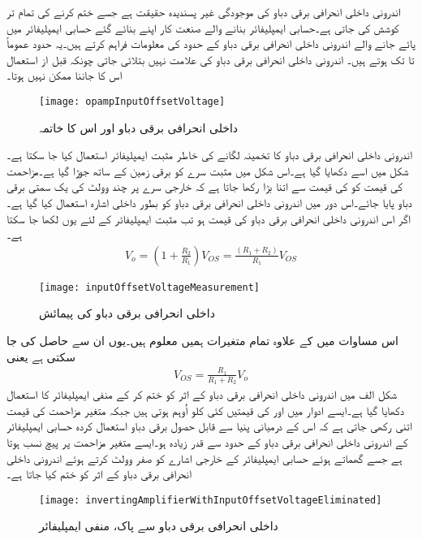 	اندرونی داخلی انحرافی برقی دباو کی موجودگی غیر پسندیدہ حقیقت ہے جسے ختم کرنے کی تمام تر کوشش کی جاتی ہے۔حسابی ایمپلیفائر بنانے والے صنعت کار اپنے بنائے گئے حسابی ایمپلیفائر میں پائے جانے والے اندرونی داخلی انحرافی برقی دباو کے حدود کی معلومات فراہم کرتے ہیں۔یہ حدود عموماً   تا  تک ہوتے ہیں۔ اندرونی داخلی انحرافی برقی دباو کی علامت نہیں بتلائی جاتی چونکہ قبل از استعمال اس کا جاننا ممکن نہیں ہوتا۔
\begin{figure}
\centering
\texttt{[image: opampInputOffsetVoltage]}
\caption{داخلی انحرافی برقی دباو اور اس کا خاتمہ}
\label{شکل_انحرافی_برقی_دباو_اور_اس_کا_خاتمہ}
\end{figure}
اندرونی داخلی انحرافی برقی دباو کا تخمینہ لگانے کی خاطر مثبت ایمپلیفائر استعمال کیا جا سکتا ہے۔شکل  میں اسے دکھایا گیا ہے۔اس شکل میں مثبت سرے کو برقی زمین کے ساتھ جوڑا گیا ہے۔مزاحمت  کی قیمت کو  کی قیمت سے اتنا بڑا رکھا جاتا ہے کہ خارجی  سرے پر چند وولٹ کی یک سمتی برقی دباو  پایا جائے۔اس دور میں اندرونی داخلی انحرافی برقی دباو کو بطور داخلی اشارہ استعمال کیا گیا ہے۔اگر اس اندرونی داخلی انحرافی برقی دباو کی قیمت  ہو تب مثبت ایمپلیفائر کے لئے یوں لکھا جا سکتا ہے۔
\begin{align}
V_{o}=\left (1+\frac{R_2}{R_1} \right ) V_{OS} =\frac{\left (R_1+R_2 \right )}{R_1} V_{OS}
\end{align}
%
\begin{figure}
\centering
\texttt{[image: inputOffsetVoltageMeasurement]}
\caption{داخلی انحرافی برقی دباو کی پیمائش}
\label{شکل_داخلی_انحرافی_برقی_دباو_کی_پیمائش}
\end{figure}
اس مساوات میں  کے علاوہ تمام متغیرات ہمیں معلوم ہیں۔یوں ان سے حاصل کی جا سکتی ہے یعنی
\begin{align}
V_{OS}=\frac{R_1}{R_1+R_2} V_{o}
\end{align}
شکل  الف میں اندرونی داخلی انحرافی برقی دباو کے اثر کو ختم کر کے منفی ایمپلیفائر کا استعمال دکھایا گیا ہے۔ایسے ادوار میں  اور کی قیمتیں کئی کلو اُوہم   ہوتی ہیں جبکہ متغیر مزاحمت  کی قیمت اتنی رکھی جاتی ہے کہ اس کے درمیانی پنیا سے قابل حصول برقی دباو استعمال کردہ حسابی ایمپلیفائر کے اندرونی داخلی انحرافی برقی دباو  کے حدود سے قدر زیادہ ہو۔ایسے متغیر مزاحمت پر پیچ نسب ہوتا ہے جسے گھماتے ہوئے حسابی ایمپلیفائر کے خارجی اشارے  کو صفر وولٹ کرتے ہوئے اندرونی داخلی انحرافی برقی دباو کے اثر کو ختم کیا جاتا ہے۔
\begin{figure}
\centering
\texttt{[image: invertingAmplifierWithInputOffsetVoltageEliminated]}
\caption{داخلی انحرافی برقی دباو سے پاک، منفی ایمپلیفائر}
\label{شکل_داخلی_انحرافی_برقی_دباو_سے_پاک_منفی_ایمپلیفائر}
\end{figure}

